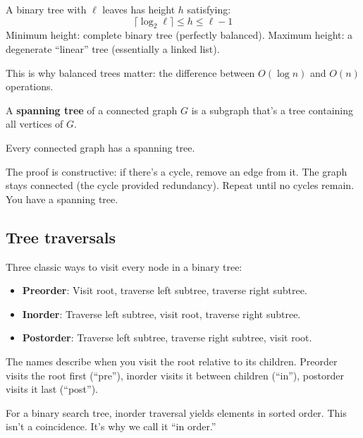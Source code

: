 \begin{theorem}
A binary tree with $\ell$ leaves has height $h$ satisfying:
\[
\lceil \log_2 \ell \rceil \leq h \leq \ell - 1
\]
Minimum height: complete binary tree (perfectly balanced).
Maximum height: a degenerate ``linear'' tree (essentially a linked list).
\end{theorem}

This is why balanced trees matter: the difference between $O(\log n)$ and $O(n)$ operations.

\begin{definition}
A \textbf{spanning tree} of a connected graph $G$ is a subgraph that's a tree containing all vertices of $G$.
\end{definition}

\begin{theorem}
Every connected graph has a spanning tree.
\end{theorem}

The proof is constructive: if there's a cycle, remove an edge from it. The graph stays connected (the cycle provided redundancy). Repeat until no cycles remain. You have a spanning tree.

\subsection*{Tree traversals}

\begin{definition}
Three classic ways to visit every node in a binary tree:
\begin{itemize}
  \item \textbf{Preorder}: Visit root, traverse left subtree, traverse right subtree.
  \item \textbf{Inorder}: Traverse left subtree, visit root, traverse right subtree.
  \item \textbf{Postorder}: Traverse left subtree, traverse right subtree, visit root.
\end{itemize}
\end{definition}

The names describe when you visit the root relative to its children. Preorder visits the root first (``pre''), inorder visits it between children (``in''), postorder visits it last (``post'').

For a binary search tree, inorder traversal yields elements in sorted order. This isn't a coincidence. It's why we call it ``in order.''

